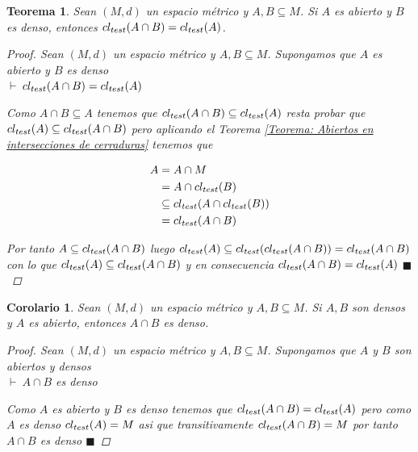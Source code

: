 \documentclass[oneside]{book} %
\theoremstyle{Teorema}
\newtheorem{Teorema}[Definicion]{Teorema}
\newtheorem{Corolario}[Definicion]{Corolario}
\theoremstyle{Ejemplos}
\theoremstyle{[Obs]}
\def \test {test}
\newcommand{\cerradura}[2][\test]{\ifx \test #1 {\overline{#2}} \else {cl_{#1}(#2)} \fi} %
\renewcommand{\{}{\left\lbrace} %
\renewcommand{\}}{\right\rbrace} %
\newcommand{\n}{\cap} %
\renewcommand{\sc}{\subseteq} %
\renewcommand{\qed}{$\blacksquare$} %
\newcommand{\pd}{$\vdash\ $} %
\begin{document}
			\begin{Teorema}\setlength{\parindent}{0em}
			
				Sean $(M, d)$ un espacio métrico y $A, B \sc M$. Si $A$ es abierto y $B$ es denso, entonces $\cerradura{A \n B} = \cerradura{A}$.
				
				\begin{proof}
					
					Sean $(M, d)$ un espacio métrico y $A, B \sc M$. Supongamos que $A$ es abierto y $B$ es denso \\ 
					\pd $\cerradura{A \n B} = \cerradura{A}$

					Como $A \n B \sc A$ tenemos que $\cerradura{A \n B} \sc \cerradura{A}$ resta probar que $\cerradura{A} \sc \cerradura{A \n B}$ pero aplicando el Teorema \ref{Teorema: Abiertos en intersecciones de cerraduras} tenemos que

					\begin{align*}
						A &= A \n M \\ 
						&= A \n \cerradura{B} \\ 
						&\sc \cerradura{A \n \cerradura{B}}  \\ 
						&= \cerradura{A \n B}
					\end{align*}

					Por tanto $A \sc \cerradura{A \n B}$ luego $\cerradura{A} \sc \cerradura{\cerradura{A \n B}} = \cerradura{A \n B}$ con lo que $\cerradura{A} \sc \cerradura{A \n B}$ y en consecuencia $\cerradura{A \n B} = \cerradura{A}$ \qed

				\end{proof}
			
			\end{Teorema}

			\begin{Corolario}\setlength{\parindent}{0em}
			
				Sean $(M, d)$ un espacio métrico y $A, B \sc M$. Si $A, B$ son densos y $A$ es abierto, entonces $A \n B$ es denso.

				\begin{proof}
					
					Sean $(M, d)$ un espacio métrico y $A, B \sc M$. Supongamos que $A$ y $B$ son abiertos y densos \\ 
					\pd $A \n B$ es denso 

					Como $A$ es abierto y $B$ es denso tenemos que $\cerradura{A \n B} = \cerradura{A}$ pero como $A$ es denso $\cerradura{A} = M$ asi que transitivamente $\cerradura{A \n B} = M$ por tanto $A \n B$ es denso \qed

				\end{proof}
			
			\end{Corolario}
\end{document}
